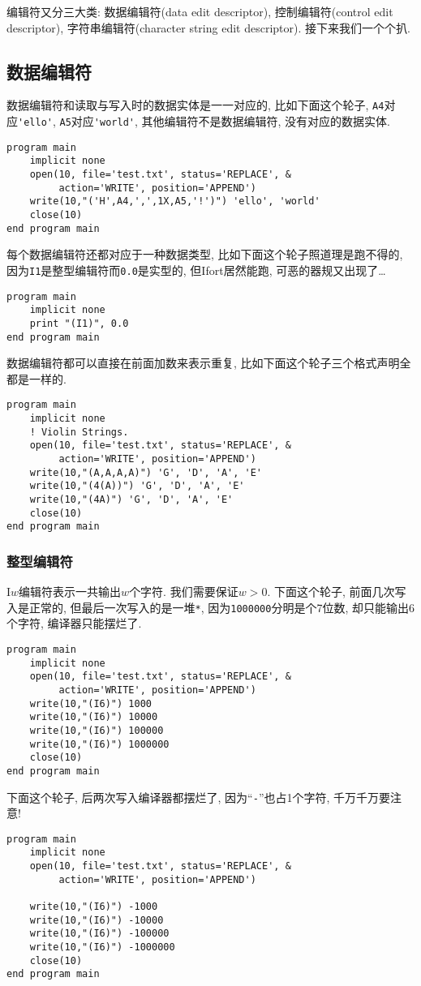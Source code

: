 编辑符又分三大类: 数据编辑符(data edit descriptor), 控制编辑符(control edit descriptor), 字符串编辑符(character string edit descriptor). 接下来我们一个个扒.

\subsection{数据编辑符}

数据编辑符和读取与写入时的数据实体是一一对应的, 比如下面这个轮子, \verb|A4|对应\verb|'ello'|, \verb|A5|对应\verb|'world'|, 其他编辑符不是数据编辑符, 没有对应的数据实体.
\begin{verbatim}
program main
    implicit none
    open(10, file='test.txt', status='REPLACE', &
         action='WRITE', position='APPEND')
    write(10,"('H',A4,',',1X,A5,'!')") 'ello', 'world'
    close(10)
end program main
\end{verbatim}
每个数据编辑符还都对应于一种数据类型, 比如下面这个轮子照道理是跑不得的, 因为\verb|I1|是整型编辑符而\verb|0.0|是实型的, 但Ifort居然能跑, 可恶的器规又出现了\dots
\begin{verbatim}
program main
    implicit none
    print "(I1)", 0.0
end program main
\end{verbatim}

数据编辑符都可以直接在前面加数来表示重复, 比如下面这个轮子三个格式声明全都是一样的.
\begin{verbatim}
program main
    implicit none
    ! Violin Strings.
    open(10, file='test.txt', status='REPLACE', &
         action='WRITE', position='APPEND')
    write(10,"(A,A,A,A)") 'G', 'D', 'A', 'E'
    write(10,"(4(A))") 'G', 'D', 'A', 'E'
    write(10,"(4A)") 'G', 'D', 'A', 'E'
    close(10)
end program main
\end{verbatim}

\subsubsection{整型编辑符}

I$w$编辑符表示一共输出$w$个字符. 我们需要保证$w>0$. 下面这个轮子, 前面几次写入是正常的, 但最后一次写入的是一堆\verb|*|, 因为\verb|1000000|分明是个7位数, 却只能输出6个字符, 编译器只能摆烂了.
\begin{verbatim}
program main
    implicit none
    open(10, file='test.txt', status='REPLACE', &
         action='WRITE', position='APPEND')
    write(10,"(I6)") 1000
    write(10,"(I6)") 10000
    write(10,"(I6)") 100000
    write(10,"(I6)") 1000000
    close(10)
end program main
\end{verbatim}
下面这个轮子, 后两次写入编译器都摆烂了, 因为``\verb|-|''也占1个字符, 千万千万要注意!
\begin{verbatim}
program main
    implicit none
    open(10, file='test.txt', status='REPLACE', &
         action='WRITE', position='APPEND')

    write(10,"(I6)") -1000
    write(10,"(I6)") -10000
    write(10,"(I6)") -100000
    write(10,"(I6)") -1000000
    close(10)
end program main
\end{verbatim}

